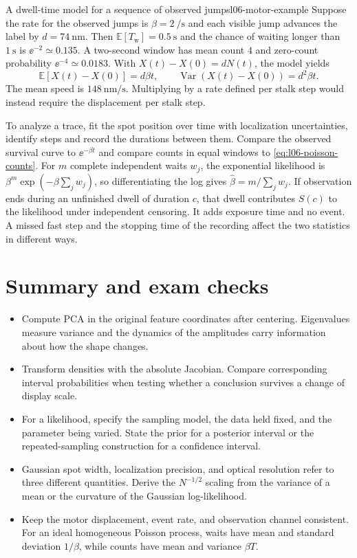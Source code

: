 \begin{example}{A dwell-time model for a sequence of observed jumps}{l06-motor-example}
Suppose the rate for the observed jumps is $\beta=\SI{2}{\per\second}$ and each visible jump advances the label by $d=\SI{74}{\nano\metre}$. Then $\mathbb E[T_{\mathrm{w}}]=\SI{0.5}{\second}$ and the chance of waiting longer than $\SI{1}{\second}$ is $\ee^{-2}\simeq0.135$. A two-second window has mean count $4$ and zero-count probability $\ee^{-4}\simeq0.0183$. With $X(t)-X(0)=dN(t)$, the model yields
\begin{equation}
 \mathbb E[X(t)-X(0)]=d\beta t,\qquad
 \operatorname{Var}(X(t)-X(0))=d^2\beta t.
 \label{eq:l06-speed}
\end{equation}
The mean speed is $\SI{148}{\nano\metre\per\second}$. Multiplying by a rate defined per stalk step would instead require the displacement per stalk step.
\end{example}

To analyze a trace, fit the spot position over time with localization uncertainties, identify steps and record the durations between them. Compare the observed survival curve to $\ee^{-\beta t}$ and compare counts in equal windows to \eqref{eq:l06-poisson-counts}. For $m$ complete independent waits $w_j$, the exponential likelihood is $\beta^m\exp(-\beta\sum_jw_j)$, so differentiating the log gives $\widehat\beta=m/\sum_j w_j$. If observation ends during an unfinished dwell of duration $c$, that dwell contributes $S(c)$ to the likelihood under independent censoring. It adds exposure time and no event. A missed fast step and the stopping time of the recording affect the two statistics in different ways.

\section*{Summary and exam checks}

\begin{itemize}
\item Compute PCA in the original feature coordinates after centering. Eigenvalues measure variance and the dynamics of the amplitudes carry information about how the shape changes.
\item Transform densities with the absolute Jacobian. Compare corresponding interval probabilities when testing whether a conclusion survives a change of display scale.
\item For a likelihood, specify the sampling model, the data held fixed, and the parameter being varied. State the prior for a posterior interval or the repeated-sampling construction for a confidence interval.
\item Gaussian spot width, localization precision, and optical resolution refer to three different quantities. Derive the $N^{-1/2}$ scaling from the variance of a mean or the curvature of the Gaussian log-likelihood.
\item Keep the motor displacement, event rate, and observation channel consistent. For an ideal homogeneous Poisson process, waits have mean and standard deviation $1/\beta$, while counts have mean and variance $\beta T$.
\end{itemize}

